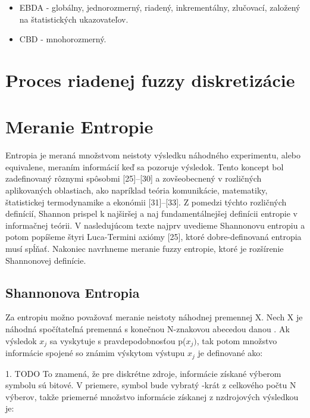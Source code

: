 \begin{itemize}
\item
EBDA - globálny, jednorozmerný, riadený, inkrementálny, zlučovací, založený na štatistických ukazovateľov. 
\cite{Sang2010} 
\item
CBD - mnohorozmerný. 
\cite{Garcia2010} 

\end{itemize}



\pagebreak
\section{Proces riadenej fuzzy diskretizácie}


















\pagebreak
\section{Meranie Entropie}
Entropia je meraná množstvom neistoty výsledku náhodného experimentu, alebo equivalene, meraním informácií keď sa pozoruje výsledok. Tento koncept bol zadefinovaný rôznymi spôsobmi [25]–[30] a zovšeobecnený v rozličných aplikovaných oblastiach, ako napríklad teória komunikácie, matematiky, štatistickej termodynamike a ekonómii [31]–[33]. Z pomedzi týchto rozličných definícií, Shannon prispel k najširšej a naj fundamentálnejšej definícii entropie v informačnej teórii. V nasledujúcom texte najprv uvedieme Shannonovu entropiu a potom popíšeme štyri Luca-Termini axiómy [25], ktoré dobre-definovaná entropia musí spĺňať. Nakoniec navrhneme meranie fuzzy entropie, ktoré je rozšírenie Shannonovej definície.

\subsection{Shannonova Entropia}
Za entropiu možno považovať meranie neistoty náhodnej premennej X. Nech X je náhodná spočítateľná premenná s konečnou N-znakovou abecedou danou   .
Ak výsledok $x_j$ sa vyskytuje s pravdepodobnosťou p($x_j)$, tak potom množstvo informácie spojené so známim výskytom výstupu $x_j$ je definované ako:

1. TODO
To znamená, že pre diskrétne zdroje, informácie získané výberom symbolu sú bitové. V priemere, symbol  bude vybratý -krát z celkového počtu N výberov, takže priemerné množstvo informácie získanej z nzdrojových výsledkou je:

